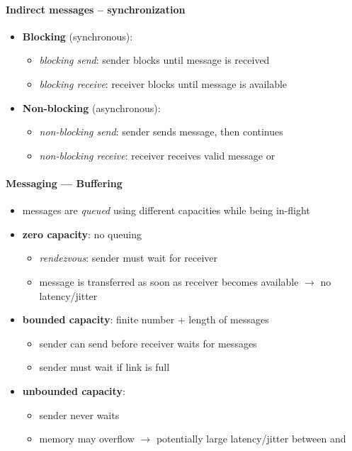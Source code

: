 \paragraph{Indirect messages -- synchronization}
\begin{itemize}
  \item \textbf{Blocking} (synchronous):
  \begin{itemize}
    \item \emph{blocking send}: sender blocks until message is received
    \item \emph{blocking receive}: receiver blocks until message is available
  \end{itemize}
  \item \textbf{Non-blocking} (asynchronous):
  \begin{itemize}
    \item \emph{non-blocking send}: sender sends message, then continues
    \item \emph{non-blocking receive}: receiver receives valid message or 
  \end{itemize}
\end{itemize}

\paragraph{Messaging --- Buffering}
\begin{itemize}
  \item messages are \emph{queued} using different capacities while being in-flight
  \item \textbf{zero capacity}: no queuing
  \begin{itemize}
    \item \emph{rendezvous}: sender must wait for receiver
    \item message is transferred as soon as receiver becomes available \( \to \) no latency/jitter
  \end{itemize}
  \item \textbf{bounded capacity}: finite number + length of messages
  \begin{itemize}
    \item sender can send before receiver waits for messages
    \item sender must wait if link is full
  \end{itemize}
  \item \textbf{unbounded capacity}:
  \begin{itemize}
    \item sender never waits
    \item memory may overflow \( \to \) potentially large latency/jitter between  and 
  \end{itemize}
\end{itemize}

